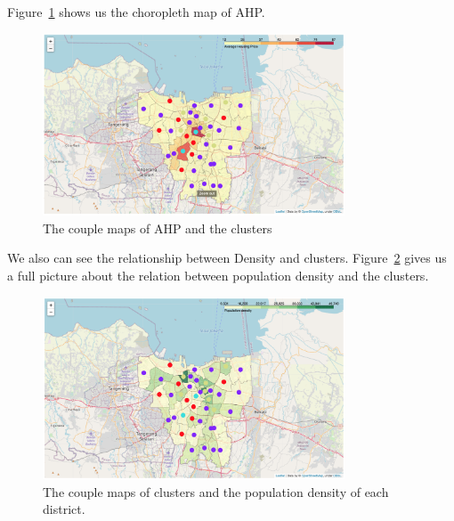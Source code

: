 \documentclass[12pt,a4paper]{article}
\begin{document}
\clearpage

Figure~\ref{fig:ahp_map} shows us the choropleth map of AHP.

\begin{center}
    \begin{figure}[htp]
    \begin{center}
     \includegraphics[width=0.8\textwidth]{fig/ahp_map}
    \end{center}
    \caption{The couple maps of AHP and the clusters}
    \label{fig:ahp_map}
    \end{figure}
\end{center}

We also can see the relationship between Density and clusters. Figure~\ref{fig:density_map} gives us a full picture about the relation between population density and the clusters.

\begin{center}
    \begin{figure}[htp]
    \begin{center}
     \includegraphics[width=0.8\textwidth]{fig/density_map}
    \end{center}
    \caption{The couple maps of clusters and the population density of each district.}
    \label{fig:density_map}
    \end{figure}
\end{center}
\end{document}
